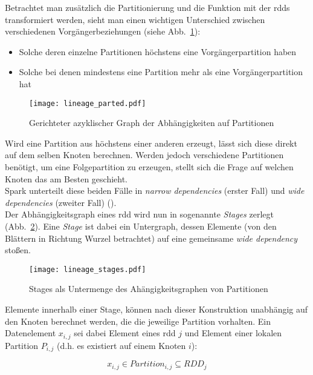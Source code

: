 Betrachtet man zusätzlich die Partitionierung und die Funktion mit der \glspl{rdd} transformiert werden, sieht man einen wichtigen Unterschied zwischen verschiedenen Vorgängerbeziehungen (siehe Abb.~\ref{fig:lineage_parted}):
\begin{itemize}
\item Solche deren einzelne Partitionen höchstens eine Vorgängerpartition haben
\item Solche bei denen mindestens eine Partition mehr als eine Vorgängerpartition hat
\end{itemize}

\begin{figure}[ht!]
	\centering
  \texttt{[image: lineage\_parted.pdf]}
	\caption{Gerichteter azyklischer Graph der Abhängigkeiten auf Partitionen}
	\label{fig:lineage_parted}
\end{figure}

Wird eine Partition aus höchstens einer anderen erzeugt, lässt sich diese direkt auf dem selben Knoten berechnen. Werden jedoch verschiedene Partitionen benötigt, um eine Folgepartition zu erzeugen, stellt sich die Frage auf welchen Knoten das am Besten geschieht.\\
Spark unterteilt diese beiden Fälle in \textit{narrow dependencies} (erster Fall) und \textit{wide dependencies} (zweiter Fall) (\cite{Mat12}).\\

Der Abhängigkeitsgraph eines \gls{rdd} wird nun in sogenannte \textit{Stages} zerlegt (Abb.~\ref{fig:lineage_stages}). Eine \textit{Stage} ist dabei ein Untergraph, dessen Elemente (von den Blättern in Richtung Wurzel betrachtet) auf eine gemeinsame \textit{wide dependency} stoßen.\\

\begin{figure}[ht!]
	\centering
  \texttt{[image: lineage\_stages.pdf]}
	\caption{Stages als Untermenge des Ahängigkeitsgraphen von Partitionen}
	\label{fig:lineage_stages}
\end{figure}

Elemente innerhalb einer Stage, können nach dieser Konstruktion unabhängig auf den Knoten berechnet werden, die die jeweilige Partition vorhalten. Ein Datenelement \(x_{i,j}\) sei dabei Element eines \gls{rdd} \(j\) und Element einer lokalen Partition \(P_{i,j}\) (d.h. es existiert auf einem Knoten \(i\)):

\[x_{i,j} \in Partition_{i,j} \subseteq RDD_j\]


